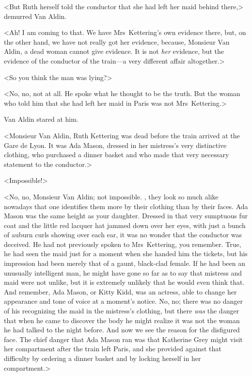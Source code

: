 <But Ruth herself told the conductor that she had left her maid behind there,> demurred Van Aldin.

<Ah! I am coming to that. We have Mrs~Kettering's own evidence there, but, on the other hand, we have not really got her evidence, because, Monsieur Van Aldin, a dead woman cannot give evidence. It is not \emph{her} evidence, but the evidence of the conductor of the train—a very different affair altogether.>

<So you think the man was lying?>

<No, no, not at all. He spoke what he thought to be the truth. But the woman who told him that she had left her maid in Paris was not Mrs~Kettering.>

Van Aldin stared at him.

<Monsieur Van Aldin, Ruth Kettering was dead before the train arrived at the Gare de Lyon. It was Ada Mason, dressed in her mistress's very distinctive clothing, who purchased a dinner basket and who made that very necessary statement to the conductor.>

<Impossible!>

<No, no, Monsieur Van Aldin; not impossible. , they look so much alike nowadays that one identifies them more by their clothing than by their faces. Ada Mason was the same height as your daughter. Dressed in that very sumptuous fur coat and the little red lacquer hat jammed down over her eyes, with just a bunch of auburn curls showing over each ear, it was no wonder that the conductor was deceived. He had not previously spoken to Mrs~Kettering, you remember. True, he had seen the maid just for a moment when she handed him the tickets, but his impression had been merely that of a gaunt, black-clad female. If he had been an unusually intelligent man, he might have gone so far as to say that mistress and maid were not unlike, but it is extremely unlikely that he would even think that. And remember, Ada Mason, or Kitty Kidd, was an actress, able to change her appearance and tone of voice at a moment's notice. No, no; there was no danger of his recognizing the maid in the mistress's clothing, but there \emph{was} the danger that when he came to discover the body he might realize it was not the woman he had talked to the night before. And now we see the reason for the disfigured face. The chief danger that Ada Mason ran was that Katherine Grey might visit her compartment after the train left Paris, and she provided against that difficulty by ordering a dinner basket and by locking herself in her compartment.>


